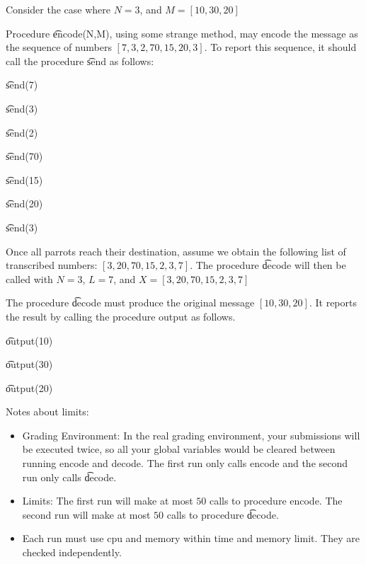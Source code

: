 Consider the case where $N = 3$, and
$M=[10,30,20]$

Procedure \t{encode(N,M)}, using some strange method, may encode the message as the sequence
of numbers $[7, 3, 2, 70, 15, 20, 3]$. To report this sequence, it should call the procedure \t{send} as
follows:

\t{send(7)}

\t{send(3)}

\t{send(2)}

\t{send(70)}

\t{send(15)}

\t{send(20)}

\t{send(3)}

Once all parrots reach their destination, assume we obtain the following list of transcribed numbers: $[3, 20, 70, 15, 2, 3, 7]$. The procedure \t{decode} will then be called with $N=3$, $L=7$, and
$X=[3, 20, 70, 15, 2, 3, 7]$

The procedure \t{decode} must produce the original message $[10, 30, 20]$. It reports the result by calling the procedure output as follows.

\t{output(10)}

\t{output(30)}

\t{output(20)}

Notes about limits:
\begin{itemize}
\item Grading Environment: In the real grading environment, your submissions will be  executed twice, so all your global variables would be cleared between running encode and decode. The first run only calls encode and the second run only calls \t{decode}.
\item Limits: The first run will make at most $50$ calls to procedure encode. The second run will make at most $50$ calls to procedure \t{decode}.
\item Each run must use cpu and memory within time and memory limit. They are checked independently.  
\end{itemize}
